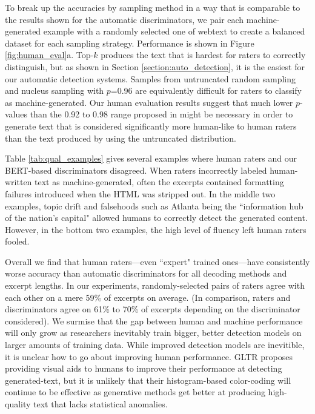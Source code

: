 To break up the accuracies by sampling method in a way that is comparable to the results shown for the automatic discriminators, we pair each machine-generated example with a randomly selected one of webtext to create a balanced dataset for each sampling strategy.
Performance is shown in Figure \ref{fig:human_eval}a.
Top-$k$ produces the text that is hardest for raters to correctly distinguish, but as shown in Section \ref{section:auto_detection}, it is the easiest for our automatic detection systems.
Samples from untruncated random sampling and nucleus sampling with $p$=0.96 are equivalently difficult for raters to classify as machine-generated.
Our human evaluation results suggest that much lower $p$-values than the 0.92 to 0.98 range proposed in \citet{zellers2019defending} might be necessary in order to generate text that is considered significantly more human-like to human raters than the text produced by using the untruncated distribution.

Table \ref{tab:qual_examples} gives several examples where human raters and our BERT-based discriminators disagreed.
When raters incorrectly labeled human-written text as machine-generated, often the excerpts contained formatting failures introduced when the HTML was stripped out.
In the middle two examples, topic drift and falsehoods such as Atlanta being the ``information hub of the nation's capital" allowed humans to correctly detect the generated content.
However, in the bottom two examples, the high level of fluency left human raters fooled.

Overall we find that human raters---even ``expert" trained ones---have consistently worse accuracy than automatic discriminators for all decoding methods and excerpt lengths.
In our experiments, randomly-selected pairs of raters agree with each other on a mere 59\% of excerpts on average. (In comparison, raters and discriminators agree on 61\% to 70\% of excerpts depending on the discriminator considered).
We surmise that the gap between human and machine performance will only grow as researchers inevitably train bigger, better  detection models on larger amounts of training data.
While improved detection models are inevitible, it is unclear how to go about improving human performance.
GLTR proposes providing visual aids to humans to improve their performance at detecting generated-text, but it is unlikely that their histogram-based color-coding will continue to be effective as generative methods get better at producing high-quality text that lacks statistical anomalies.

